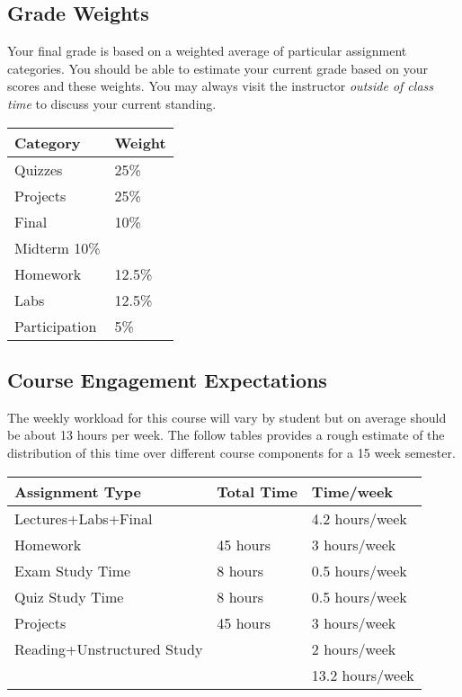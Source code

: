 \documentclass[10pt]{article}
\begin{document}
\subsection{Grade Weights}

Your final grade is based on a weighted average of particular assignment categories.  You should be able to estimate your current grade based on your scores and these weights.  You may always visit the instructor \textit{outside of class time} to discuss your current standing.

\begin{center}
  \begin{tabular}{ll}
  Category & Weight \\ \toprule
    Quizzes & 25\% \\
    Projects & 25\% \\
    Final & 10\% \\
    Midterm 10\% \\
    Homework & 12.5\% \\
    Labs & 12.5\% \\
    Participation & 5\%
  \end{tabular}
\end{center}



\subsection{Course Engagement Expectations}

The weekly workload for this course will vary by student but on average should be about 13 hours per week.  The follow tables provides a rough estimate of the distribution of this time over different course components for a 15 week semester.
\begin{center}
\begin{tabular}{lll}
Assignment Type & Total Time & Time/week \\ \toprule
Lectures+Labs+Final &      & 4.2 hours/week \\
Homework & 45 hours        & 3 hours/week \\
Exam Study Time & 8 hours  & 0.5 hours/week \\
Quiz Study Time & 8 hours & 0.5 hours/week \\
Projects & 45 hours        & 3 hours/week \\
Reading+Unstructured Study & & 2 hours/week \\
\bottomrule
& & 13.2 hours/week
\end{tabular}
\end{center}
\end{document}
